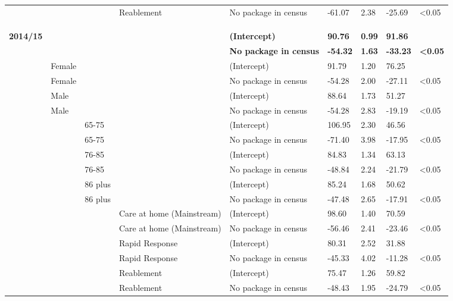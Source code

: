 \documentclass[]{article}
\begin{document}
\begin{landscape}
\begin{longtable}[c]{@{}lllllllll@{}}
 &  &  & Reablement & No package in census & -61.07 & 2.38 & -25.69 & \textless{}0.05 \\
 \\
 \\
 \\
\textbf{2014/15} & \textbf{} & \textbf{} & \textbf{} & \textbf{(Intercept)} & \textbf{90.76} & \textbf{0.99} & \textbf{91.86} & \textbf{} \\
\textbf{} & \textbf{} & \textbf{} & \textbf{} & \textbf{No package in census} & \textbf{-54.32} & \textbf{1.63} & \textbf{-33.23} & \textbf{\textless{}0.05} \\
 & Female &  &  & (Intercept) & 91.79 & 1.20 & 76.25 &  \\
 & Female &  &  & No package in census & -54.28 & 2.00 & -27.11 & \textless{}0.05 \\
 & Male &  &  & (Intercept) & 88.64 & 1.73 & 51.27 &  \\
 & Male &  &  & No package in census & -54.28 & 2.83 & -19.19 & \textless{}0.05 \\
 &  & 65-75 &  & (Intercept) & 106.95 & 2.30 & 46.56 &  \\
 &  & 65-75 &  & No package in census & -71.40 & 3.98 & -17.95 & \textless{}0.05 \\
 &  & 76-85 &  & (Intercept) & 84.83 & 1.34 & 63.13 &  \\
 &  & 76-85 &  & No package in census & -48.84 & 2.24 & -21.79 & \textless{}0.05 \\
 &  & 86 plus &  & (Intercept) & 85.24 & 1.68 & 50.62 &  \\
 &  & 86 plus &  & No package in census & -47.48 & 2.65 & -17.91 & \textless{}0.05 \\
 &  &  & Care at home (Mainstream) & (Intercept) & 98.60 & 1.40 & 70.59 &  \\
 &  &  & Care at home (Mainstream) & No package in census & -56.46 & 2.41 & -23.46 & \textless{}0.05 \\
 &  &  & Rapid Response & (Intercept) & 80.31 & 2.52 & 31.88 &  \\
 &  &  & Rapid Response & No package in census & -45.33 & 4.02 & -11.28 & \textless{}0.05 \\
 &  &  & Reablement & (Intercept) & 75.47 & 1.26 & 59.82 &  \\
 &  &  & Reablement & No package in census & -48.43 & 1.95 & -24.79 & \textless{}0.05 \\* \bottomrule
\end{longtable}
\end{landscape}
\end{document}
